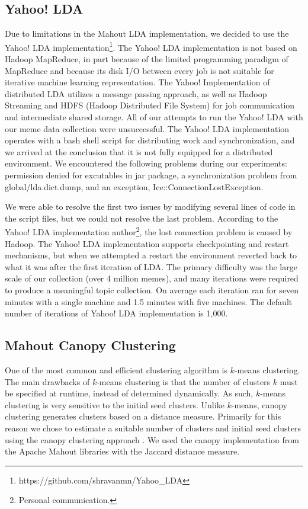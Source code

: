 \documentclass{sig-alternate}
\begin{document}
\subsection{Yahoo! LDA}
Due to limitations in the Mahout LDA implementation, we decided to use the Yahoo! LDA implementation\footnote{https://github.com/shravanmn/Yahoo\_LDA}. The Yahoo! LDA implementation is not based on Hadoop MapReduce, in part because of the limited programming paradigm of MapReduce and because its disk I/O between every job is not suitable for iterative machine learning representation. The Yahoo! Implementation of distributed LDA utilizes a message passing approach, as well as Hadoop Streaming and HDFS (Hadoop Distributed File System) for job communication and intermediate shared storage. All of our attempts to run the Yahoo! LDA with our meme data collection were unsuccessful. The Yahoo! LDA implementation operates with a bash shell script for distributing work and synchronization, and we arrived at the conclusion that it is not fully equipped for a distributed environment. We encountered the following problems during our experiments: permission denied for excutables in jar package, a synchronization problem from global/lda.dict.dump, and an exception, Ice::ConnectionLostException.

We were able to resolve the first two issues by modifying several lines of code in the script files, but we could not resolve the last problem. According to the Yahoo! LDA implementation author\footnote{Personal communication.}, the lost connection problem is caused by Hadoop. The Yahoo! LDA implementation supports checkpointing and restart mechanisms, but when we attempted a restart the environment reverted back to what it was after the first iteration of LDA. The primary difficulty was the large scale of our collection (over 4 million memes), and many iterations were required to produce a meaningful topic collection. On average each iteration ran for seven minutes with a single machine and 1.5 minutes with five machines. The default number of iterations of Yahoo! LDA implementation is 1,000.

\subsection{Mahout Canopy Clustering}
One of the most common and efficient clustering algorithm is $k$-means clustering. The main drawbacks of $k$-means clustering is that the number of clusters $k$ must be specified at runtime, instead of determined dynamically. As such, $k$-means clustering is very sensitive to the initial seed clusters. Unlike $k$-means, canopy clustering generates clusters based on a distance measure. Primarily for this reason we chose to estimate a suitable number of clusters and initial seed clusters using the canopy clustering approach \cite{McCallum2000}. We used the canopy implementation from the Apache Mahout libraries with the Jaccard distance measure.
\end{document}
